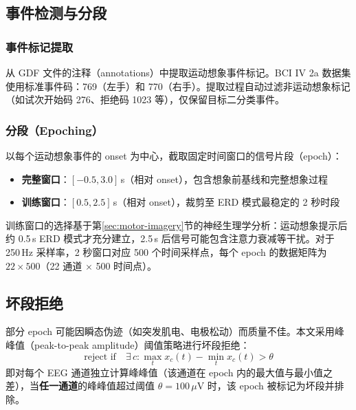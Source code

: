 \subsection{事件检测与分段}
\label{sec:epoching}

\subsubsection{事件标记提取}

从 GDF 文件的注释（annotations）中提取运动想象事件标记。BCI IV 2a 数据集使用标准事件码：769（左手）和 770（右手）。提取过程自动过滤非运动想象标记（如试次开始码 276、拒绝码 1023 等），仅保留目标二分类事件。

\subsubsection{分段（Epoching）}

以每个运动想象事件的 onset 为中心，截取固定时间窗口的信号片段（epoch）：

\begin{itemize}[leftmargin=2em]
	\item \textbf{完整窗口}：$[-0.5, 3.0]$\,s（相对 onset），包含想象前基线和完整想象过程
	\item \textbf{训练窗口}：$[0.5, 2.5]$\,s（相对 onset），裁剪至 ERD 模式最稳定的 2 秒时段
\end{itemize}

训练窗口的选择基于第\ref{sec:motor-imagery}节的神经生理学分析：运动想象提示后约 0.5\,s ERD 模式才充分建立，2.5\,s 后信号可能包含注意力衰减等干扰。对于 250\,Hz 采样率，2 秒窗口对应 500 个时间采样点，每个 epoch 的数据矩阵为 $22 \times 500$（22 通道 $\times$ 500 时间点）。

\subsection{坏段拒绝}
\label{sec:epoch-rejection}

部分 epoch 可能因瞬态伪迹（如突发肌电、电极松动）而质量不佳。本文采用峰峰值（peak-to-peak amplitude）阈值策略进行坏段拒绝：
\begin{equation}\label{eq:reject}
\text{reject if} \quad \exists\, c: \max_t x_c(t) - \min_t x_c(t) > \theta
\end{equation}
即对每个 EEG 通道独立计算峰峰值（该通道在 epoch 内的最大值与最小值之差），当\textbf{任一通道}的峰峰值超过阈值 $\theta = 100\,\mu\text{V}$ 时，该 epoch 被标记为坏段并排除。

